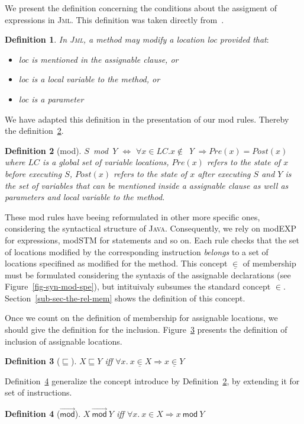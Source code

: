 \documentclass[a4paper]{llncs}
\newcommand{\jml}{\textsc{Jml}}
\newcommand{\java}{\textsc{Java}}
\newtheorem {df}{Definition}
\begin{document}
We present the definition concerning the conditions about the assigment
of expressions in \jml. This definition was taken directly
from~\cite{LeavensBR00}.
\begin{df}
\label{def-mod}
In \jml, a method may modify a location \emph{loc} provided that$:$
\begin{itemize}
\item \emph{loc} is mentioned in the \emph{assignable} clause, or
\item \emph{loc} is a local variable to the method, or 
\item \emph{loc} is a parameter
\end{itemize}
\end{df}

We have adapted this definition in the presentation of our \textsf{mod}
rules. Thereby the definition~\ref{df-mod}.
\begin{df}[\textsf{mod}]
\label{df-mod}
$S$\ \textsf{mod}\ $Y$ $\Leftrightarrow$ $\forall x \in LC.
x\not\in$ \textsc{Y}$\ \Rightarrow Pre(x) = Post(x)$ \\
where $LC$ is a global set of variable locations, $Pre(x)$
refers to the state of $x$ before executing $S$,
$Post(x)$ refers to the state of $x$ after executing
$S$ and $Y$ is the set of variables that can be mentioned
inside a assignable clause as well as parameters and local variable to the 
method.
\end{df}
These \textsf{mod} rules have beeing reformulated in other more
specific ones, considering the syntactical structure of
\java. Consequently, we rely on \textsf{modEXP} for
expressions, \textsf{modSTM} for statements and so on. Each rule
checks that the set of locations modified by the corresponding
instruction \emph{belongs} to a set of locations specifined as modified for
the method. This concept $\underline\in$ of membership must be
formulated considering
the syntaxis of the assignable declarations (see
Figure~\ref{fig-syn-mod-spe}), but intituivaly subsumes the standard
concept $\in$. Section~\ref{sub-sec-the-rel-mem} shows the definition
of this concept. 

Once we count on the definition of membership for assignable
locations, we should give the definition for the
inclusion. Figure~\ref{def-subseq} presents the definition of inclusion of
assignable locations.
\begin{df}[$\sqsubseteq$]
\label{def-subseq}
$X \sqsubseteq Y$ iff $\forall x.\ x\underline{\in}X\Rightarrow
x\underline\in Y$
\end{df} 
Definition~\ref{def-mod-lis} generalize the concept introduce by
Definition~\ref{df-mod}, by extending it for set of instructions.
\begin{df}[$\overrightarrow{\textsf{mod}}$]
\label{def-mod-lis}
$X\ \overrightarrow{\textsf{mod}}\ Y$ iff $\forall x.\ x\in
X\Rightarrow x\ \textsf{mod}\ Y$
\end{df}
\end{document}
